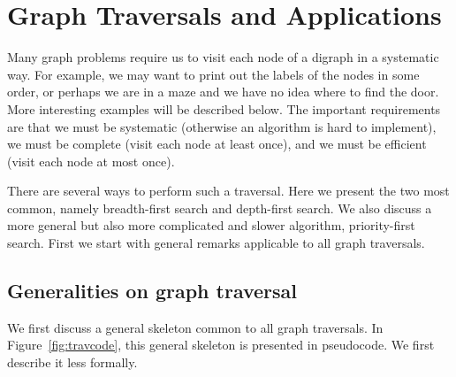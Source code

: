 \chapter{Graph Traversals and Applications}
\label{ch:traversal}

Many graph problems require us to visit each node of a digraph in a 
systematic way. For example, we may want to print out the labels of the
nodes in some order, or perhaps we are in a maze and we have
no idea where to find the door. More interesting examples will be
described below. The important requirements are that we must be
systematic (otherwise an algorithm is hard to implement), we must be
complete (visit each node at least once), and we must be efficient
(visit each node at most once). 

There are several ways to perform such a traversal.  Here we present the
two most common, namely breadth-first search and depth-first search.
We also discuss a more general but also more complicated and slower 
algorithm, priority-first search. First we start with general remarks 
applicable to all graph traversals.

\section{Generalities on graph traversal}
\label{sec:trav}

We first discuss a general skeleton common to all graph traversals. In
Figure~\ref{fig:travcode}, this general skeleton is presented in
pseudocode. We first describe it less formally.

